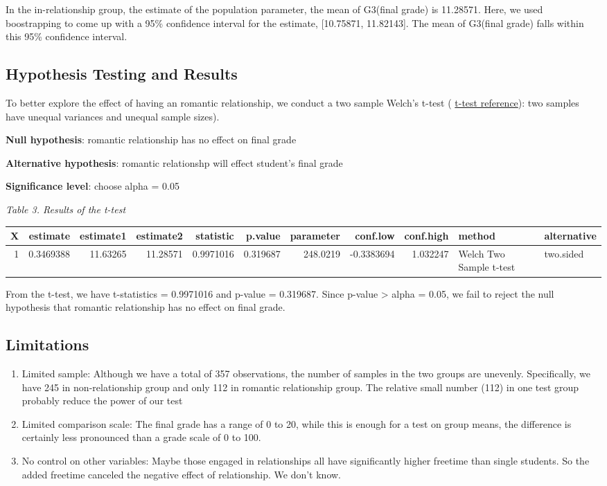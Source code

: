 \documentclass[]{article}
\begin{document}
In the in-relationship group, the estimate of the population parameter,
the mean of G3(final grade) is 11.28571. Here, we used boostrapping to
come up with a 95\% confidence interval for the estimate, {[}10.75871,
11.82143{]}. The mean of G3(final grade) falls within this 95\%
confidence interval.

\subsection{Hypothesis Testing and
Results}\label{hypothesis-testing-and-results}

To better explore the effect of having an romantic relationship, we
conduct a two sample Welch's t-test (
\href{https://en.wikipedia.org/wiki/Welch\%27s_t-test}{t-test
reference}): two samples have unequal variances and unequal sample
sizes).

\textbf{Null hypothesis}: romantic relationship has no effect on final
grade

\textbf{Alternative hypothesis}: romantic relationshp will effect
student's final grade

\textbf{Significance level}: choose alpha = 0.05

\emph{Table 3. Results of the t-test}

\begin{longtable}[]{@{}rrrrrrrrrll@{}}
\toprule
X & estimate & estimate1 & estimate2 & statistic & p.value & parameter &
conf.low & conf.high & method & alternative\tabularnewline
\midrule
\endhead
1 & 0.3469388 & 11.63265 & 11.28571 & 0.9971016 & 0.319687 & 248.0219 &
-0.3383694 & 1.032247 & Welch Two Sample t-test &
two.sided\tabularnewline
\bottomrule
\end{longtable}

From the t-test, we have t-statistics = 0.9971016 and p-value =
0.319687. Since p-value \textgreater{} alpha = 0.05, we fail to reject
the null hypothesis that romantic relationship has no effect on final
grade.

\subsection{Limitations}\label{limitations}

\begin{enumerate}
\def\labelenumi{\arabic{enumi}.}
\item
  Limited sample: Although we have a total of 357 observations, the
  number of samples in the two groups are unevenly. Specifically, we
  have 245 in non-relationship group and only 112 in romantic
  relationship group. The relative small number (112) in one test group
  probably reduce the power of our test
\item
  Limited comparison scale: The final grade has a range of 0 to 20,
  while this is enough for a test on group means, the difference is
  certainly less pronounced than a grade scale of 0 to 100.
\item
  No control on other variables: Maybe those engaged in relationships
  all have significantly higher freetime than single students. So the
  added freetime canceled the negative effect of relationship. We don't
  know.
\end{enumerate}
\end{document}
